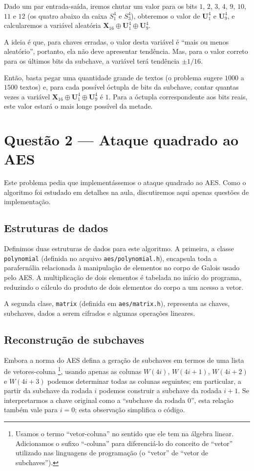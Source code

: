 \documentclass{article}
\newcommand{\xor}{\oplus}
\newcommand{\X}{\textbf{X}}
\newcommand{\U}{\textbf{U}}
\begin{document}
Dado um par entrada-saída,
iremos chutar um valor para os bits $1$, $2$, $3$, $4$, $9$, $10$, $11$ e $12$
(os quatro abaixo da caixa $S_1^4$ e $S_3^4$),
obteremos o valor de $\U_1^4$ e $\U_9^4$,
e calcularemos a variável aleatória $\X_{16} \xor \U_1^4 \xor \U_9^4$.

A ideia é que, para chaves erradas,
o valor desta variável é ``mais ou menos aleatório'',
portanto, ela não deve apresentar tendência.
Mas, para o valor correto para os últimos bits da subchave,
a variável terá tendência $\pm 1/16$.

Então, basta pegar uma quantidade grande de textos
(o problema sugere $1000$ a $1500$ textos)
e, para cada possível óctupla de bits da subchave,
contar quantas vezes a variável $\X_{16} \xor \U_1^4 \xor \U_9^4$ é $1$.
Para a óctupla correspondente aos bits reais,
este valor estará o mais longe possível da metade.

\section{Questão 2 --- Ataque quadrado ao AES}

Este problema pedia que implementássemos o ataque quadrado ao AES.
Como o algoritmo foi estudado em detalhes na aula,
discutiremos aqui apenas questões de implementação.

\subsection{Estruturas de dados}

Definimos duas estruturas de dados para este algoritmo.
A primeira,
a classe \verb"polynomial"
(definida no arquivo \verb"aes/polynomial.h"),
encapsula toda a parafernália relacionada
à manipulação de elementos no corpo de Galois usado pelo AES.
A multiplicação de dois elementos é tabelada no início do programa,
reduzindo o cálculo do produto de dois elementos do corpo
a um acesso a vetor.

A segunda clase,
\verb"matrix" (definida em \verb"aes/matrix.h"),
representa as chaves, subchaves, dados a serem cifrados
e algumas operações lineares.

\subsection{Reconstrução de subchaves}

Embora a norma do AES defina a geração de subchaves em termos de
uma lista de vetores-coluna%
\footnote{
    Usamos o termo ``vetor-coluna'' no sentido que ele tem na álgebra linear.
    Adicionamos o sufixo ``-coluna'' para diferenciá-lo
    do conceito de ``vetor'' utilizado nas linguagens de programação
    (o ``vetor'' de ``vetor de subchaves'').
},
usando apenas as colunas $W(4i)$, $W(4i+1)$, $W(4i+2)$ e $W(4i+3)$
podemos determinar todas as colunas seguintes;
em particular,
a partir da subchave da rodada $i$
podemos construir a subchave da rodada $i+1$.
Se interpretarmos a chave original como a ``subchave da rodada $0$'',
esta relação também vale para $i = 0$;
esta observação simplifica o código.
\end{document}
